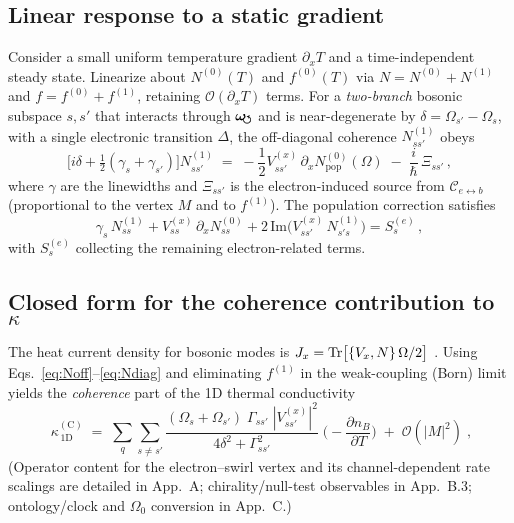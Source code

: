 \documentclass[aps,prb,preprint,amsmath,amssymb]{revtex4-2} %
\newcommand{\omegas}{\boldsymbol{\omega}_{\!\mkern-2mu\scriptstyle\boldsymbol{\circlearrowleft}}}
\begin{document}
        \subsection{Linear response to a static gradient}
            Consider a small uniform temperature gradient $\partial_x T$ and a time-independent steady state. Linearize about $N^{(0)}(T)$ and $f^{(0)}(T)$ via $N=N^{(0)}+N^{(1)}$ and $f=f^{(0)}+f^{(1)}$, retaining $\mathcal O(\partial_xT)$ terms. For a \emph{two-branch} bosonic subspace $s,s'$ that interacts through $\omegas$ and is near-degenerate by $\delta=\Omega_{s'}-\Omega_s$, with a single electronic transition $\Delta$, the off-diagonal coherence $N^{(1)}_{ss'}$ obeys
            \begin{equation}
                \Big[i\delta + \tfrac12(\gamma_s+\gamma_{s'})\Big] N^{(1)}_{ss'}
                \;=\; -\frac{1}{2} V^{(x)}_{ss'}\, \partial_x N^{(0)}_{\mathrm{pop}}(\Omega) \; -\; \frac{i}{\hbar}\,\Xi_{ss'}\,,
                \label{eq:Noff}
            \end{equation}
            where $\gamma$ are the linewidths and $\Xi_{ss'}$ is the electron-induced source from $\mathcal C_{e\leftrightarrow b}$ (proportional to the vertex $M$ and to $f^{(1)}$). The population correction satisfies
            \begin{equation}
                \gamma_s\, N^{(1)}_{ss} + V^{(x)}_{ss}\,\partial_x N^{(0)}_{ss} + 2\,\mathrm{Im}\!\big( V^{(x)}_{ss'}\,N^{(1)}_{s's}\big) = S^{(e)}_s\,,
                \label{eq:Ndiag}
            \end{equation}
            with $S^{(e)}_s$ collecting the remaining electron-related terms.

        \subsection{Closed form for the coherence contribution to $\kappa$}
            The heat current density for bosonic modes is $J_x= \Tr\!\big[ \{V_x, N\}\,\Omega/2 \big]$ \cite{Hardy1963,Simoncelli2022}. Using Eqs.~\eqref{eq:Noff}--\eqref{eq:Ndiag} and eliminating $f^{(1)}$ in the weak-coupling (Born) limit yields the \emph{coherence} part of the 1D thermal conductivity
            \begin{equation}
                \boxed{\;\kappa^{(\mathrm C)}_{\!\,1\mathrm D}\;=\;\sum_{q}\sum_{s\neq s'} \frac{(\Omega_s+\Omega_{s'})\;\Gamma_{ss'}\; |V^{(x)}_{ss'}|^2}{4\delta^2+\Gamma_{ss'}^2}\;\bigg(-\frac{\partial n_B}{\partial T}\bigg)\; +\; \mathcal O(|M|^2)\;,}\label{eq:kC}
            \end{equation}
            (Operator content for the electron–swirl vertex and its channel-dependent rate scalings are detailed in App.~A; chirality/null-test observables in App.~B.3; ontology/clock and $\Omega_0$ conversion in App.~C.)
\end{document}
